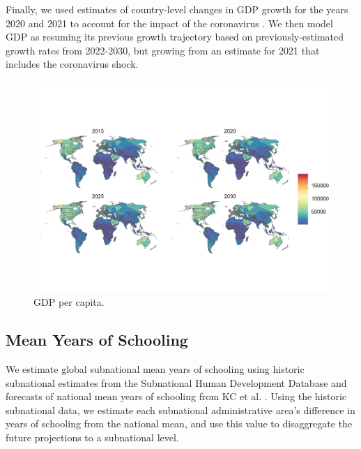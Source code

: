 \documentclass{article}
\begin{document}
Finally, we used estimates of country-level changes in GDP growth for the years 2020 and 2021 to account for the impact of the coronavirus \citep{prospects2020}.  We then model GDP as resuming its previous growth trajectory based on previously-estimated growth rates from 2022-2030, but growing from an estimate for 2021 that includes the coronavirus shock.

\begin{figure}[H]
  \centering
  \includegraphics[width=\linewidth]{img/covars/gdp_percap.png}
  \caption{GDP per capita.}
\end{figure}

\subsection{Mean Years of Schooling}
We estimate global subnational mean years of schooling using historic subnational estimates from the Subnational Human Development Database \cite{Smits2019} and forecasts of national mean years of schooling from KC et al. \cite{KC2017}.  Using the historic subnational data, we estimate each subnational administrative area's difference in years of schooling from the national mean, and use this value to disaggregate the future projections to a subnational level.
\end{document}
